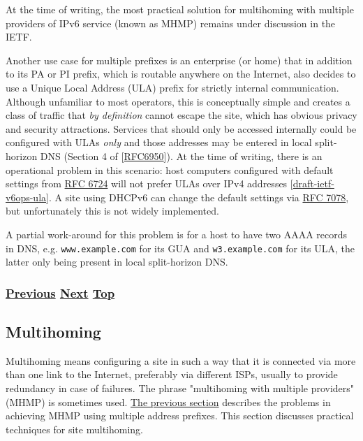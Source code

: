 \documentclass[
]{article}
\begin{document}
At the time of writing, the most practical solution for multihoming with
multiple providers of IPv6 service (known as MHMP) remains under
discussion in the IETF.

Another use case for multiple prefixes is an enterprise (or home) that
in addition to its PA or PI prefix, which is routable anywhere on the
Internet, also decides to use a Unique Local Address (ULA) prefix for
strictly internal communication. Although unfamiliar to most operators,
this is conceptually simple and creates a class of traffic that \emph{by
definition} cannot escape the site, which has obvious privacy and
security attractions. Services that should only be accessed internally
could be configured with ULAs \emph{only} and those addresses may be
entered in local split-horizon DNS (Section 4 of
{[}\href{https://www.rfc-editor.org/info/rfc6950}{RFC6950}{]}). At the
time of writing, there is an operational problem in this scenario: host
computers configured with default settings from
\href{https://www.rfc-editor.org/info/rfc6724}{RFC 6724} will not prefer
ULAs over IPv4 addresses
{[}\href{https://datatracker.ietf.org/doc/draft-ietf-v6ops-ula/}{draft-ietf-v6ops-ula}{]}.
A site using DHCPv6 can change the default settings via
\href{https://www.rfc-editor.org/info/rfc7078}{RFC 7078}, but
unfortunately this is not widely implemented.

A partial work-around for this problem is for a host to have two AAAA
records in DNS, e.g. \texttt{www.example.com} for its GUA and
\texttt{w3.example.com} for its ULA, the latter only being present in
local split-horizon DNS.

\subsubsection{\texorpdfstring{\hyperref[security-operation]{Previous}
\hyperref[multihoming]{Next}
\hyperref[management-and-operations]{Top}}{Previous Next Top}}\label{previous-next-top-30}

\pagebreak

\subsection{Multihoming}\label{multihoming}

Multihoming means configuring a site in such a way that it is connected
via more than one link to the Internet, preferably via different ISPs,
usually to provide redundancy in case of failures. The phrase
"multihoming with multiple providers" (MHMP) is sometimes used.
\hyperref[multi-prefix-operation]{The previous section} describes the
problems in achieving MHMP using multiple address prefixes. This section
discusses practical techniques for site multihoming.
\end{document}
